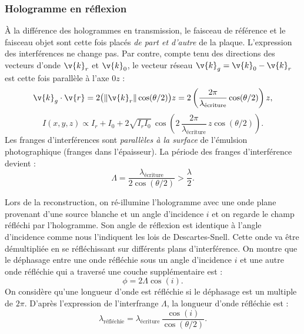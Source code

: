 \subsubsection{Hologramme en réflexion}
À la différence des hologrammes en transmission, le faisceau de référence et le
faisceau objet sont cette fois placés \emph{de part et d'autre} de la plaque.
L'expression des interférences ne change pas. Par contre, compte tenu des
directions des vecteurs d'onde $\v{k}_r$ et $\v{k}_0$, le vecteur réseau
$\v{k}_g=\v{k}_0-\v{k}_r$ est cette fois parallèle à l'axe $0z$ :
\begin{equation*}
  \v{k}_g\cdot\v{r} = 2\big(\|\v{k}_r\|\cos(\theta/2)\big)z
  = 2\left(\frac{2\pi}{\lambda_{\text{écriture}}}\cos(\theta/2)\right)z,
\end{equation*}
\begin{equation*}
  I(x,y,z) \propto I_r+I_0+2\sqrt{I_r I_0}\,
  \cos\!\left(2\,\frac{2\pi}{\lambda_{\text{écriture}}}\,z\cos(\theta/2)\right).
\end{equation*}
Les franges d'interférences sont \emph{parallèles à la surface} de l'émulsion
photographique (franges dans l'épaisseur). La période des franges d'interférence
devient :
\begin{equation*}
  \boxed{\;\Lambda = \frac{\lambda_{\text{écriture}}}{2\cos(\theta/2)}
  > \frac{\lambda}{2}.\;}
\end{equation*}

Lors de la reconstruction, on ré-illumine l'hologramme avec une onde plane
provenant d'une source blanche et un angle d'incidence $i$ et on regarde le champ
réfléchi par l'hologramme. Son angle de réflexion est identique à l'angle
d'incidence comme nous l'indiquent les lois de Descartes-Snell. Cette onde va
être démultipliée en se réfléchissant sur différents plans d'interférence. On
montre que le déphasage entre une onde réfléchie sous un angle d'incidence $i$
et une autre onde réfléchie qui a traversé une couche supplémentaire est :
\begin{equation*}
  \phi = 2\Lambda\cos(i).
\end{equation*}
On considère qu'une longueur d'onde est réfléchie si le déphasage est un
multiple de $2\pi$. D'après l'expression de l'interfrange $\Lambda$, la longueur
d'onde réfléchie est :
\begin{equation*}
  \boxed{\;\lambda_{\text{réfléchie}}
  = \lambda_{\text{écriture}}\,\frac{\cos(i)}{\cos(\theta/2)}.\;}
\end{equation*}

